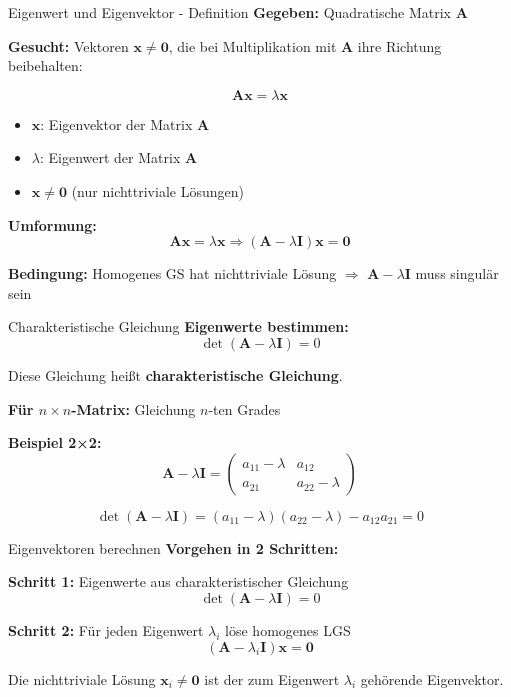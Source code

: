 \documentclass[a4paper, fontsize=7pt]{scrartcl}
\begin{document}
\begin{mainbox}{Eigenwert und Eigenvektor - Definition}
\textbf{Gegeben:} Quadratische Matrix $\mathbf{A}$

\textbf{Gesucht:} Vektoren $\mathbf{x} \neq \mathbf{0}$, die bei Multiplikation mit $\mathbf{A}$ ihre Richtung beibehalten:

$$\mathbf{Ax} = \lambda\mathbf{x}$$

\begin{itemize}
    \item $\mathbf{x}$: Eigenvektor der Matrix $\mathbf{A}$
    \item $\lambda$: Eigenwert der Matrix $\mathbf{A}$
    \item $\mathbf{x} \neq \mathbf{0}$ (nur nichttriviale Lösungen)
\end{itemize}

\textbf{Umformung:}
$$\mathbf{Ax} = \lambda\mathbf{x} \Rightarrow (\mathbf{A} - \lambda\mathbf{I})\mathbf{x} = \mathbf{0}$$

\textbf{Bedingung:} Homogenes GS hat nichttriviale Lösung $\Rightarrow$ $\mathbf{A} - \lambda\mathbf{I}$ muss singulär sein
\end{mainbox}

\begin{mainbox}{Charakteristische Gleichung}
\textbf{Eigenwerte bestimmen:}
$$\det(\mathbf{A} - \lambda\mathbf{I}) = 0$$

Diese Gleichung heißt \textbf{charakteristische Gleichung}.

\textbf{Für $n \times n$-Matrix:} Gleichung $n$-ten Grades

\textbf{Beispiel 2×2:}
$$\mathbf{A} - \lambda\mathbf{I} = \begin{pmatrix} a_{11} - \lambda & a_{12} \\ a_{21} & a_{22} - \lambda \end{pmatrix}$$

$$\det(\mathbf{A} - \lambda\mathbf{I}) = (a_{11} - \lambda)(a_{22} - \lambda) - a_{12}a_{21} = 0$$
\end{mainbox}

\begin{mainbox}{Eigenvektoren berechnen}
\textbf{Vorgehen in 2 Schritten:}

\textbf{Schritt 1:} Eigenwerte aus charakteristischer Gleichung
$$\det(\mathbf{A} - \lambda\mathbf{I}) = 0$$

\textbf{Schritt 2:} Für jeden Eigenwert $\lambda_i$ löse homogenes LGS
$$(\mathbf{A} - \lambda_i\mathbf{I})\mathbf{x} = \mathbf{0}$$

Die nichttriviale Lösung $\mathbf{x}_i \neq \mathbf{0}$ ist der zum Eigenwert $\lambda_i$ gehörende Eigenvektor.
\end{mainbox}
\end{document}
